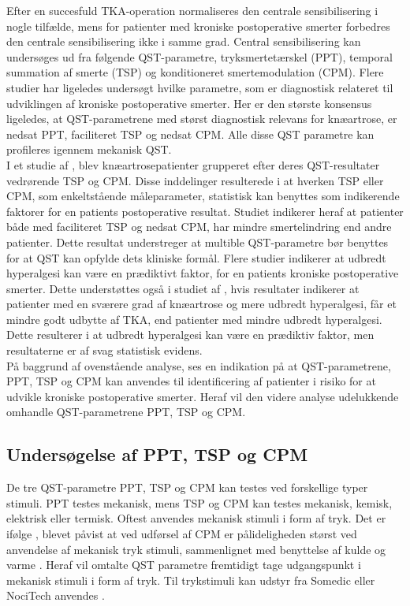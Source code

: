 Efter en succesfuld TKA-operation normaliseres den centrale sensibilisering i nogle tilfælde, mens for patienter med kroniske postoperative smerter forbedres den centrale sensibilisering ikke i samme grad. Central sensibilisering kan undersøges ud fra følgende QST-parametre, tryksmertetærskel (PPT), temporal summation af smerte (TSP) og konditioneret smertemodulation (CPM). \citep{Arendt-Nielsen2015b} Flere studier har ligeledes undersøgt hvilke parametre, som er diagnostisk relateret til udviklingen af kroniske postoperative smerter. Her er den største konsensus ligeledes, at QST-parametrene med størst diagnostisk relevans for knæartrose, er nedsat PPT, faciliteret TSP og nedsat CPM. Alle disse QST parametre kan profileres igennem mekanisk QST. \citep{Petersen2015} \citep{Petersen2016} \citep{Wylde2015b} \\
I et studie af , blev knæartrosepatienter grupperet efter deres QST-resultater vedrørende TSP og CPM. Disse inddelinger resulterede i at hverken TSP eller CPM, som enkeltstående måleparameter, statistisk kan benyttes som indikerende faktorer for en patients postoperative resultat. Studiet indikerer heraf at patienter både med faciliteret TSP og nedsat CPM, har mindre smertelindring end andre patienter. Dette resultat understreger at multible QST-parametre bør benyttes for at QST kan opfylde dets kliniske formål. \citep{Petersen2016} Flere studier indikerer at udbredt hyperalgesi kan være en prædiktivt faktor, for en patients kroniske postoperative smerter. \citep{Petersen2016} \citep{Wylde2013} Dette understøttes også i studiet af , hvis resultater indikerer at patienter med en sværere grad af knæartrose og mere udbredt hyperalgesi, får et mindre godt udbytte af TKA, end patienter med mindre udbredt hyperalgesi. Dette resulterer i at udbredt hyperalgesi kan være en prædiktiv faktor, men resultaterne er af svag statistisk evidens. \citep{Wylde2016c}\\
På baggrund af ovenstående analyse, ses en indikation på at QST-parametrene, PPT, TSP og CPM kan anvendes til identificering af patienter i risiko for at udvikle kroniske postoperative smerter. Heraf vil den videre analyse udelukkende omhandle QST-parametrene PPT, TSP og CPM.

\subsection{Undersøgelse af PPT, TSP og CPM}
De tre QST-parametre PPT, TSP og CPM kan testes ved forskellige typer stimuli. PPT testes mekanisk, mens TSP og CPM kan testes mekanisk, kemisk, elektrisk eller termisk. Oftest anvendes mekanisk stimuli i form af tryk. \citep{Suokas2012} \citep{Yarnitsky2006} Det er ifølge \citep{Imai2016}, blevet påvist at ved udførsel af CPM er pålideligheden størst ved anvendelse af mekanisk tryk stimuli, sammenlignet med benyttelse af kulde og varme \citep{Imai2016}. Heraf vil omtalte QST parametre fremtidigt tage udgangspunkt i mekanisk stimuli i form af tryk. Til trykstimuli kan udstyr fra Somedic eller NociTech anvendes \citep{Wylde2015b} \citep{Petersen2016}. 

